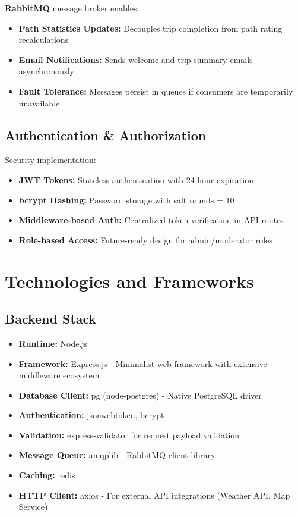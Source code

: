 \textbf{RabbitMQ} message broker enables:
\begin{itemize}
    \item \textbf{Path Statistics Updates:} Decouples trip completion from path rating recalculations
    \item \textbf{Email Notifications:} Sends welcome and trip summary emails asynchronously
    \item \textbf{Fault Tolerance:} Messages persist in queues if consumers are temporarily unavailable
\end{itemize}

\subsection{Authentication \& Authorization}
\label{subsec:auth_design}

Security implementation:
\begin{itemize}
    \item \textbf{JWT Tokens:} Stateless authentication with 24-hour expiration
    \item \textbf{bcrypt Hashing:} Password storage with salt rounds = 10
    \item \textbf{Middleware-based Auth:} Centralized token verification in API routes
    \item \textbf{Role-based Access:} Future-ready design for admin/moderator roles
\end{itemize}

\section{Technologies and Frameworks}
\label{sec:technologies_frameworks}

\subsection{Backend Stack}
\label{subsec:backend_stack}

\begin{itemize}
    \item \textbf{Runtime:} Node.js
    \item \textbf{Framework:} Express.js - Minimalist web framework with extensive middleware ecosystem
    \item \textbf{Database Client:} pg (node-postgres) - Native PostgreSQL driver
    \item \textbf{Authentication:} jsonwebtoken, bcrypt
    \item \textbf{Validation:} express-validator for request payload validation
    \item \textbf{Message Queue:} amqplib - RabbitMQ client library
    \item \textbf{Caching:} redis
    \item \textbf{HTTP Client:} axios - For external API integrations (Weather API, Map Service)
\end{itemize}

